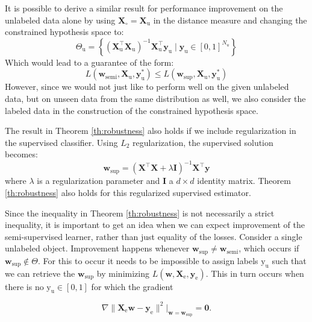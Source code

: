 \documentclass{article}
\renewcommand{\vec}[1]{\mathbf{#1}}
\begin{document}
It is possible to derive a similar result for performance improvement on the unlabeled data alone by using $\vec{X}_\circ=\vec{X}_\text{u}$ in the distance measure and changing the constrained hypothesis space to:
\begin{equation}
\label{eq:constrainedregion2}
\Theta_\text{u} = \left\{ (\vec{X}_\mathrm{u}^\top \vec{X}_\mathrm{u})^{-1} \vec{X}_\mathrm{u}^\top \vec{y}_\mathrm{u} \mid \vec{y}_\text{u} \in [0,1]^{N_u} \right\}
\end{equation}
Which would lead to a guarantee of the form:
\begin{equation}
L(\vec{w}_\mathrm{semi},\vec{X}_\mathrm{u},\vec{y}_\mathrm{u}^{\ast}) \leq L(\vec{w}_\mathrm{sup},\vec{X}_\mathrm{u},\vec{y}_\mathrm{u}^{\ast})
\end{equation}
However, since we would not just like to perform well on the given unlabeled data, but on unseen data from the same distribution as well, we also consider the labeled data in the construction of the constrained hypothesis space.

The result in Theorem \ref{th:robustness} also holds if we include regularization in the supervised classifier. Using $L_2$ regularization, the supervised solution becomes:
\begin{equation}
\label{eq:regsupervisedsolution}
\vec{w}_{\text{sup}} = (\vec{X}^\top \vec{X} + \lambda \vec{I})^{-1} \vec{X}^\top \vec{y}
\end{equation}
where $\lambda$ is a regularization parameter and $\vec{I}$ a $d \times d$ identity matrix. Theorem \ref{th:robustness} also holds for this regularized supervised estimator.

Since the inequality in Theorem \ref{th:robustness} is not necessarily a strict inequality, it is important to get an idea when we can expect improvement of the semi-supervised learner, rather than just equality of the losses. Consider a single unlabeled object. Improvement happens whenever $\vec{w}_\text{sup} \neq \vec{w}_\text{semi}$, which occurs if $\vec{w}_\text{sup} \notin \Theta$.  For this to occur it needs to be impossible to assign labels $\text{y}_\text{u}$ such that we can retrieve the $\vec{w}_\text{sup}$ by minimizing $L(\vec{w},\vec{X}_\text{e},\vec{y}_\text{e})$. This in turn occurs when there is no $\text{y}_\text{u} \in [0,1]$ for which the gradient

\begin{equation}
\nabla \lVert \vec{X}_\text{e} \vec{w} - \vec{y}_\text{e} \rVert^2\bigg|_{\vec{w}=\vec{w}_\text{sup}}=\vec{0}.
\end{equation}
\end{document}
